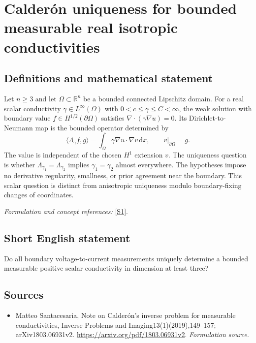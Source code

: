 \documentclass[11pt]{article}
\begin{document}
\section*{\texorpdfstring{Calderón uniqueness for bounded measurable real isotropic conductivities}{Calderón uniqueness for bounded measurable real isotropic conductivities}}\label{30006854}
\subsection{Definitions and mathematical statement}
Let $n\ge3$ and let $\Omega\subset{\mathbb{R}}^n$ be a bounded connected Lipschitz domain. For a real scalar conductivity $\gamma\in L^\infty(\Omega)$ with $0<c\le\gamma\le C<\infty$, the weak solution with boundary value $f\in H^{1/2}(\partial\Omega)$ satisfies $\nabla\cdot(\gamma\nabla u)=0$. Its Dirichlet-to-Neumann map is the bounded operator determined by
\[
 \langle\Lambda_\gamma f,g\rangle
 =\int_\Omega\gamma\nabla u\cdot\nabla v{\,\mathrm{d}} x,
 \qquad v|_{\partial\Omega}=g.
\]
The value is independent of the chosen $H^1$ extension $v$. The uniqueness question is whether $\Lambda_{\gamma_1}=\Lambda_{\gamma_2}$ implies $\gamma_1=\gamma_2$ almost everywhere. The hypotheses impose no derivative regularity, smallness, or prior agreement near the boundary. This scalar question is distinct from anisotropic uniqueness modulo boundary-fixing changes of coordinates.
\par\smallskip\textit{Formulation and concept references:} \href{https://arxiv.org/pdf/1803.06931v2}{[S1]}.

\subsection{Short English statement}
Do all boundary voltage-to-current measurements uniquely determine a bounded measurable positive scalar conductivity in dimension at least three?
\subsection{Sources}
\begin{itemize}
\item[S1]Matteo Santacesaria, Note on Calderón's inverse problem for measurable conductivities, Inverse Problems and Imaging13(1)(2019),149–157; arXiv1803.06931v2.
\url{https://arxiv.org/pdf/1803.06931v2}.
\textit{Formulation source.}
\end{itemize}
\end{document}

